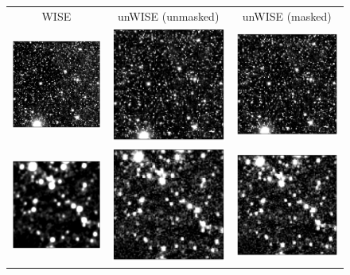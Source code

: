 \documentclass[11pt,preprint]{aastex}
\begin{document}
%
%
\begin{figure}
\begin{center}
\begin{tabular}{@{}ccc@{}}
WISE & unWISE (unmasked) & unWISE (masked) \\
\includegraphics[height=0.25\textwidth]{plots2/co-00} &
\includegraphics[height=0.25\textwidth]{plots2/co-01} &
\includegraphics[height=0.25\textwidth]{plots2/co-02} \\
\includegraphics[height=0.25\textwidth]{plots2/co-03} &
\includegraphics[height=0.25\textwidth]{plots2/co-04} &
\includegraphics[height=0.25\textwidth]{plots2/co-05} \\

\end{tabular}
\end{center}
\end{figure}
\end{document}
